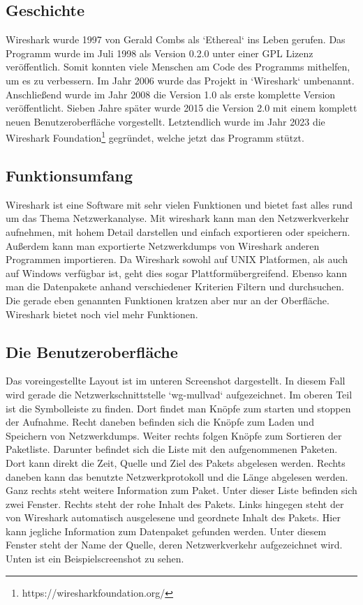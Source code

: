 \documentclass[12pt]{article}
\begin{document}
\subsection{Geschichte}
Wireshark wurde 1997 von Gerald Combs als `Ethereal` ins Leben gerufen. Das Programm wurde im Juli 1998 als Version 0.2.0 unter einer GPL Lizenz\cite{gnu-gpl} veröffentlich.\cite{gnu-wireshark} Somit konnten viele Menschen am Code des Programms mithelfen, um es zu verbessern. Im Jahr 2006 wurde das Projekt in `Wireshark` umbenannt. Anschließend wurde  im Jahr 2008 die Version 1.0 als erste komplette Version veröffentlicht. Sieben Jahre später wurde 2015 die Version 2.0 mit einem komplett neuen Benutzeroberfläche vorgestellt. Letztendlich wurde im Jahr 2023 die Wireshark Foundation\footnote{https://wiresharkfoundation.org/} gegründet, welche jetzt das Programm stützt. \cite{wireshark-history}

\subsection{Funktionsumfang}

Wireshark ist eine Software mit sehr vielen Funktionen und bietet fast alles rund um das Thema Netzwerkanalyse. Mit wireshark kann man den Netzwerkverkehr aufnehmen, mit hohem Detail darstellen und einfach exportieren oder speichern. Außerdem kann man exportierte Netzwerkdumps von Wireshark anderen Programmen importieren. Da Wireshark sowohl auf UNIX Platformen, als auch auf Windows verfügbar ist, geht dies sogar Plattformübergreifend. Ebenso kann man die Datenpakete anhand verschiedener Kriterien Filtern und durchsuchen. Die gerade eben genannten Funktionen kratzen aber nur an der Oberfläche. Wireshark bietet noch viel mehr Funktionen.\cite{features}

\subsection{Die Benutzeroberfläche}

Das voreingestellte Layout ist im unteren Screenshot dargestellt. In diesem Fall wird gerade die Netzwerkschnittstelle `wg-mullvad` aufgezeichnet. Im oberen Teil ist die Symbolleiste zu finden. Dort findet man Knöpfe zum starten und stoppen der Aufnahme.  Recht daneben befinden sich die Knöpfe zum Laden und Speichern von Netzwerkdumps. Weiter rechts folgen Knöpfe zum Sortieren der Paketliste. Darunter befindet sich die Liste mit den aufgenommenen Paketen. Dort kann direkt die Zeit, Quelle und Ziel des Pakets abgelesen werden. Rechts daneben kann das benutzte Netzwerkprotokoll und die Länge abgelesen werden. Ganz rechts steht weitere Information zum Paket. Unter dieser Liste befinden sich zwei Fenster. Rechts steht der rohe Inhalt des Pakets. Links hingegen steht der von Wireshark automatisch ausgelesene und geordnete Inhalt des Pakets. Hier kann jegliche Information zum Datenpaket gefunden werden. Unter diesem Fenster steht der Name der Quelle, deren Netzwerkverkehr aufgezeichnet wird. Unten ist ein Beispielscreenshot zu sehen.
\end{document}
